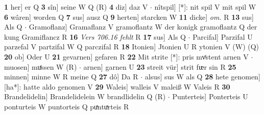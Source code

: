 \documentclass[8pt,a4paper,notitlepage]{article}
\begin{document}
\begin{table}[ht]
\begin{minipage}[t]{0.5\linewidth}
\textbf{1} her] er Q \textbf{3} sîn] seine W Q (R) \textbf{4} diz] daz V  $\cdot$ nîtspil] [*]: nit spil V mit spil W \textbf{6} wâren] worden Q \textbf{7} sus] ausz Q \textbf{9} herten] starcken W \textbf{11} dicke] \textit{om.} R \textbf{13} sus] Als Q  $\cdot$ Gramoflanz] Gramaflanz V gramoflantz W der konigk gramoflantz Q der kung Gramiflancz R \textbf{16} \textit{Vers 706.16 fehlt} R  \textbf{17} sus] Als Q  $\cdot$ Parcifal] Parzifal U parzefal V partzifal W Q parczifal R \textbf{18} Itonien] Jtonien U R ytonien V (W) (Q) \textbf{20} ob] Oder U \textbf{21} gevarnen] gefaren R \textbf{22} Mit strite [*]: pris mvͤstent arnen V  $\cdot$ muosen] muͤssen W (R)  $\cdot$ arnen] garnen U \textbf{23} streit vür] strit fᵫr sin R \textbf{25} minnen] minne W R meine Q \textbf{27} dô] Da R  $\cdot$ alsus] sus W als Q \textbf{28} hete genomen] [ha*]: hatte aldo genomen V \textbf{29} Waleis] walleis V maleiß W Valeis R \textbf{30} Brandelidelin] Brandelidelein W brandlidelin Q (R)  $\cdot$ Punterteis] Ponterteis U ponturteis W puntorteis Q puͯntuͯrteis R \newline
\end{minipage}
\end{table}
\end{document}
